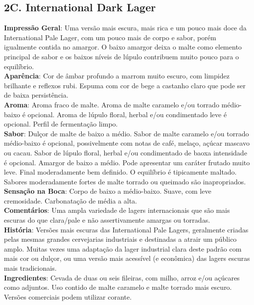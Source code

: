 \subsection*{2C. International Dark Lager}
\textbf{Impressão Geral}: Uma versão mais escura, mais rica e um pouco mais doce da International Pale Lager, com um pouco mais de corpo e sabor, porém igualmente contida no amargor. O baixo amargor deixa o malte como elemento principal de sabor e os baixos níveis de lúpulo contribuem muito pouco para o equilíbrio. \\
\textbf{Aparência}: Cor de âmbar profundo a marrom muito escuro, com limpidez brilhante e reflexos rubi. Espuma com cor de bege a castanho claro que pode ser de baixa persistência. \\
\textbf{Aroma}: Aroma fraco de malte. Aroma de malte caramelo e/ou torrado médio-baixo é opcional. Aroma de lúpulo floral, herbal e/ou condimentado leve é opcional. Perfil de fermentação limpo. \\
\textbf{Sabor}: Dulçor de malte de baixo a médio. Sabor de malte caramelo e/ou torrado médio-baixo é opcional, possivelmente com notas de café, melaço, açúcar mascavo ou cacau. Sabor de lúpulo floral, herbal e/ou condimentado de baoxa intensidade é opcional. Amargor de baixo a médio. Pode apresentar um caráter frutado muito leve. Final moderadamente bem definido. O equilíbrio é tipicamente maltado. Sabores moderadamente fortes de malte torrado ou queimado são inapropriados. \\
\textbf{Sensação na Boca}: Corpo de baixo a médio-baixo. Suave, com leve cremosidade. Carbonatação de média a alta. \\
\textbf{Comentários}: Uma ampla variedade de lagers internacionais que são mais escuras do que clara/pale e não assertivamente amargas ou torradas. \\
\textbf{História}: Versões mais escuras das International Pale Lagers, geralmente criadas pelas mesmas grandes cervejarias industriais e destinadas a atrair um público amplo. Muitas vezes uma adaptação da lager industrial clara deste padrão com mais cor ou dulçor, ou uma versão mais acessível (e econômica) das lagers escuras mais tradicionais. \\
\textbf{Ingredientes}: Cevada de duas ou seis fileiras, com milho, arroz e/ou açúcares como adjuntos. Uso contido de malte caramelo e malte torrado mais escuro. Versões comerciais podem utilizar corante. \\

